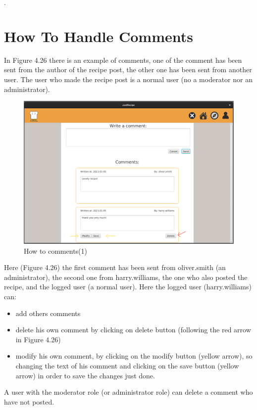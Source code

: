 \documentclass[a4paper]{report}
\begin{document}
\newpage
.
\newpage
\section{How To Handle Comments}
In Figure 4.26 there is an example of comments, one of the comment has been sent from the author of the recipe post, the other one has been sent from another user. The user who made the recipe post is a normal user (no a moderator nor  an administrator).
\begin{figure}[htpb]
	\centering
	\includegraphics[scale=0.37]{img/user_manual/comment1.png}
	\caption{How to comments(1)}
\end{figure}
Here (Figure 4.26) the first comment has been sent from oliver.smith (an administrator), the second one from harry.williams, the one who also posted the recipe, and the logged user (a normal user). Here the logged user (harry.williams) can:
\begin{itemize}
	\item add others comments
	\item delete his own comment by clicking on delete button (following the red arrow in Figure 4.26)
	\item modify his own comment, by clicking on the modify button (yellow arrow), so changing the text of his comment and clicking on the save button (yellow arrow) in order to save the changes just done.
\end{itemize}
A user with the moderator role (or administrator role) can delete a comment who have not posted.
\end{document}
